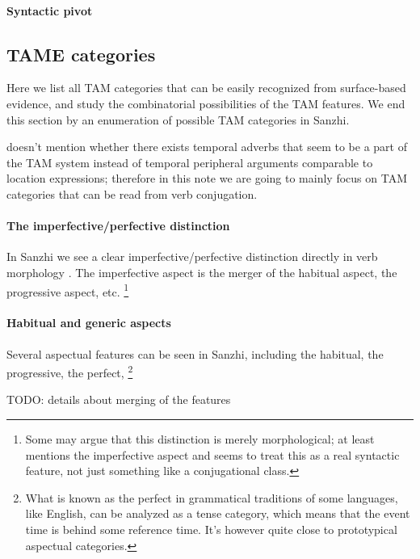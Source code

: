 \documentclass[a4paper, oneside, 12pt]{report}
\newcommand*{\citepage}[1]{p.~{#1}}
\begin{document}
\paragraph*{Syntactic pivot} 

\subsection{TAME categories} 

Here we list all TAM categories that can be easily recognized from surface-based evidence, 
and study the combinatorial possibilities of the TAM features.
We end this section by an enumeration of possible TAM categories in Sanzhi.

\citet{forker2020grammar} doesn't mention whether there exists 
temporal adverbs that seem to be a part of the TAM system 
instead of temporal peripheral arguments comparable to location expressions; 
therefore in this note we are going to mainly focus on TAM categories 
that can be read from verb conjugation.

\paragraph*{The imperfective/perfective distinction} 
In Sanzhi we see a clear imperfective/perfective distinction directly in verb morphology 
\citep[\citepage{206}]{forker2020grammar}. 
The imperfective aspect is the merger of the habitual aspect, the progressive aspect, etc.%
\footnote{
    Some may argue that this distinction is merely morphological; 
    at least \citet[\citepage{206}]{forker2020grammar} mentions the imperfective aspect 
    and seems to treat this as a real syntactic feature, 
    not just something like a conjugational class. 
}

\paragraph*{Habitual and generic aspects} 
Several aspectual features can be seen in Sanzhi, 
including the habitual, the progressive, the perfect,%
\footnote{
    What is known as the perfect in grammatical traditions of some languages, like English,
    can be analyzed as a tense category, 
    which means that the event time is behind some reference time. 
    It's however quite close to prototypical aspectual categories.
}



TODO: details about merging of the features 
\end{document}
